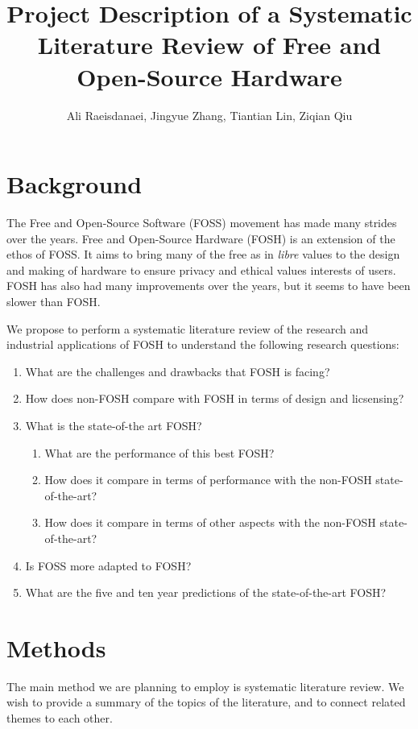 \documentclass{article}
\begin{document}


\title{Project Description of a Systematic Literature Review of Free and Open-Source Hardware}
\author{Ali Raeisdanaei, Jingyue Zhang, Tiantian Lin, Ziqian Qiu }
\date{}
\maketitle

\section{Background}
The Free and Open-Source Software (FOSS) movement has made many strides over the years.
Free and Open-Source Hardware (FOSH) is an extension of the ethos of FOSS.
It aims to bring many of the free as in \textit{libre} values to the design and making of hardware to ensure privacy and ethical values interests of users.
FOSH has also had many improvements over the years, but it seems to have been slower than FOSH.

We propose to perform a systematic literature review of the research and industrial applications of FOSH to understand the following research questions:
\begin{enumerate}
    \item What are the challenges and drawbacks that FOSH is facing?
    \item How does non-FOSH compare with FOSH in terms of design and licsensing?
    \item What is the state-of-the art FOSH?
          \begin{enumerate}
              \item What are the performance of this best FOSH?
              \item How does it compare in terms of performance with the non-FOSH state-of-the-art?
              \item How does it compare in terms of other aspects with the non-FOSH state-of-the-art?
          \end{enumerate}

    \item Is FOSS more adapted to FOSH?
    \item What are the five and ten year predictions of the state-of-the-art FOSH?
\end{enumerate}

\section{Methods}
The main method we are planning to employ is systematic literature review.
We wish to provide a summary of the topics of the literature, and to connect related themes to each other.
\end{document}
